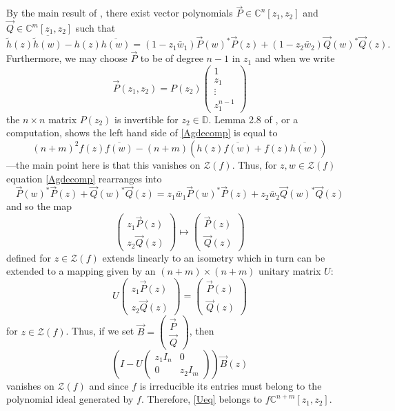 \documentclass[11 pt,reqno]{amsart}
\theoremstyle{definition}
\theoremstyle{remark}
\numberwithin{equation}{section} \numberwithin{figure}{section}
\begin{document}
By the main result of \cite{Kne10}, there exist vector polynomials
$\vec{P}\in {{\mathbb C}}^{n}[z_1,z_2]$ and $\vec{Q} \in {{\mathbb C}}^{m}[z_1,z_2]$ such
that
\begin{equation} \label{Agdecomp}
\tilde{h}(z) \overline{\tilde{h}(w)} - h(z) \overline{h(w)} =
(1-z_1\bar{w}_1) \vec{P}(w)^* \vec{P}(z) + (1-z_2\bar{w}_2)
\vec{Q}(w)^* \vec{Q}(z).
\end{equation}
Furthermore, we may choose $\vec{P}$ to be of degree $n-1$ in $z_1$
and when we write
\begin{equation} \label{Pfactor}
\vec{P}(z_1,z_2) = P(z_2) \begin{pmatrix} 1 \\ z_1 \\ \vdots \\
  z_1^{n-1} \end{pmatrix} 
\end{equation}
the $n\times n$ matrix $P(z_2)$ is invertible for $z_2 \in {{\mathbb D}}$.
Lemma 2.8 of \cite{Kne09}, or a computation, shows the left hand side
of \eqref{Agdecomp} is equal to
\[
(n+m)^2 f(z) \overline{f(w)} - (n+m)( h(z) \overline{f(w)} + f(z)
\overline{h(w)})
\]
---the main point here is that this vanishes on ${\mathcal{Z}}(f)$.  Thus,
for $z,w \in {\mathcal{Z}}(f)$ equation \eqref{Agdecomp} rearranges into
\[
 \vec{P}(w)^* \vec{P}(z) + \vec{Q}(w)^* \vec{Q}(z) = z_1\bar{w}_1 \vec{P}(w)^* \vec{P}(z) + z_2\bar{w}_2
\vec{Q}(w)^* \vec{Q}(z)
\]
and so the map 
\[
\begin{pmatrix} z_1\vec{P}(z) \\ z_2 \vec{Q}(z) \end{pmatrix}
\mapsto \begin{pmatrix} \vec{P}(z) \\ \vec{Q}(z) \end{pmatrix}
\]
defined for $z \in {\mathcal{Z}}(f)$ extends linearly to an isometry which in
turn can be extended to a mapping given by an $(n+m)\times (n+m)$
unitary matrix $U$:
\[
U \begin{pmatrix} z_1\vec{P}(z) \\ z_2 \vec{Q}(z) \end{pmatrix}
= \begin{pmatrix} \vec{P}(z) \\ \vec{Q}(z) \end{pmatrix}
\]
for $z \in {\mathcal{Z}}(f)$. Thus, if we set $\vec{B} = \begin{pmatrix} \vec{P}
  \\ \vec{Q} \end{pmatrix}$, then
\begin{equation} \label{Ueq}
\left(I-U \begin{pmatrix} z_1 I_n & 0 \\ 0 & z_2 I_m \end{pmatrix}
\right) \vec{B}(z)
\end{equation}
vanishes on ${\mathcal{Z}}(f)$ and since $f$ is irreducible its entries must
belong to the polynomial ideal generated by $f$.  Therefore,
\eqref{Ueq} belongs to $f {{\mathbb C}}^{n+m}[z_1,z_2]$.  
\end{document}
